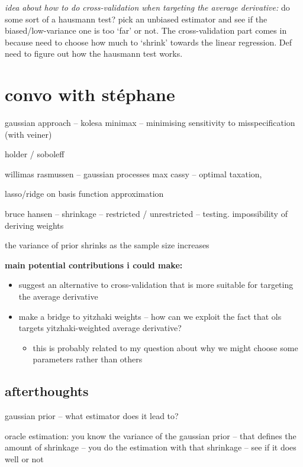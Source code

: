 \documentclass[a4paper,12pt,twoside]{article}
\begin{document}
\textit{idea about how to do cross-validation when targeting the average derivative:} do some sort of a hausmann test? pick an unbiased estimator and see if the biased/low-variance one is too `far' or not. The cross-validation part comes in because need to choose how much to `shrink' towards the linear regression. Def need to figure out how the hausmann test works.

\section*{convo with stéphane}

gaussian approach -- kolesa minimax -- minimising sensitivity to misspecification (with veiner)

holder / soboleff

willimas rasmussen -- gaussian processes
max cassy -- optimal taxation, 

lasso/ridge on basis function approximation

bruce hansen -- shrinkage -- restricted / unrestricted -- testing.
impossibility of deriving weights

the variance of prior shrinks as the sample size increases

\textbf{main potential contributions i could make:}

\begin{itemize}
  \item suggest an alternative to cross-validation that is more suitable for targeting the average derivative
  \item make a bridge to yitzhaki weights -- how can we exploit the fact that ols targets yitzhaki-weighted average derivative?
	\begin{itemize}
	  \item this is probably related to my question about why we might choose some parameters rather than others
	\end{itemize}
 
\end{itemize}



\subsection*{afterthoughts}

gaussian prior -- what estimator does it lead to?

oracle estimation: you know the variance of the gaussian prior -- that defines the amount of shrinkage -- you do the estimation with that shrinkage -- see if it does well or not
\end{document}
